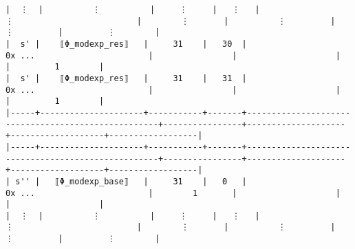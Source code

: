 \documentclass[varwidth=\maxdimen,margin=0.5cm,multi={verbatim}]{standalone}
\begin{document}
\begin{verbatim}
|  ⋮  |          ⋮          |     ⋮     |   ⋮   |                          ⋮                         |        ⋮       |          ⋮         |         ⋮         |         ⋮        |
|  s' |    ⟦Φ_modexp_res⟧   |     31    |   30  |                       0x ...                       |                |                    |                   |         1        |
|  s' |    ⟦Φ_modexp_res⟧   |     31    |   31  |                       0x ...                       |                |                    |                   |         1        |
|-----+---------------------+-----------+-------+----------------------------------------------------+----------------+--------------------+-------------------+------------------|
|-----+---------------------+-----------+-------+----------------------------------------------------+----------------+--------------------+-------------------+------------------|
| s'' |   ⟦Φ_modexp_base⟧   |     31    |   0   |                       0x ...                       |        1       |                    |                   |                  |
|  ⋮  |          ⋮          |     ⋮     |   ⋮   |                          ⋮                         |        ⋮       |          ⋮         |         ⋮         |         ⋮        |
\end{verbatim}
\end{document}
